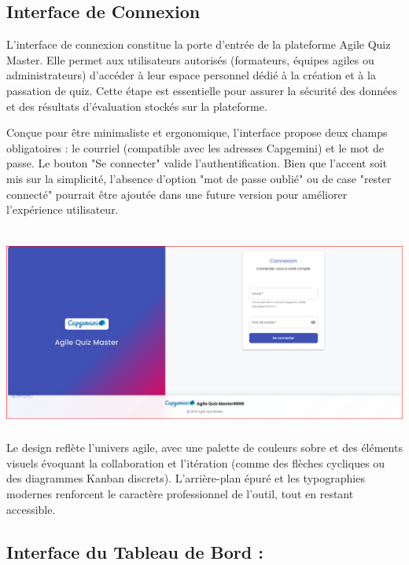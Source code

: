 \documentclass[12pt,a4paper,twoside]{report}
\begin{document}
\hypertarget{interface-de-connexion}{%
\subsection{Interface de Connexion}\label{interface-de-connexion}}

L'interface de connexion constitue la porte d'entrée de la plateforme
Agile Quiz Master. Elle permet aux utilisateurs autorisés (formateurs,
équipes agiles ou administrateurs) d'accéder à leur espace personnel
dédié à la création et à la passation de quiz. Cette étape est
essentielle pour assurer la sécurité des données et des résultats
d'évaluation stockés sur la plateforme.

Conçue pour être minimaliste et ergonomique, l'interface propose deux
champs obligatoires : le courriel (compatible avec les adresses
Capgemini) et le mot de passe. Le bouton "Se connecter" valide
l'authentification. Bien que l'accent soit mis sur la simplicité,
l'absence d'option "mot de passe oublié" ou de case "rester connecté"
pourrait être ajoutée dans une future version pour améliorer
l'expérience utilisateur.

\includegraphics[width=6.3in,height=2.75972in]{latex_media/media/image51.png}Le
design reflète l'univers agile, avec une palette de couleurs sobre et
des éléments visuels évoquant la collaboration et l'itération (comme des
flèches cycliques ou des diagrammes Kanban discrets). L'arrière-plan
épuré et les typographies modernes renforcent le caractère professionnel
de l'outil, tout en restant accessible.

\hypertarget{interface-du-tableau-de-bord}{%
\subsection{Interface du Tableau de Bord
:}\label{interface-du-tableau-de-bord}}
\end{document}

